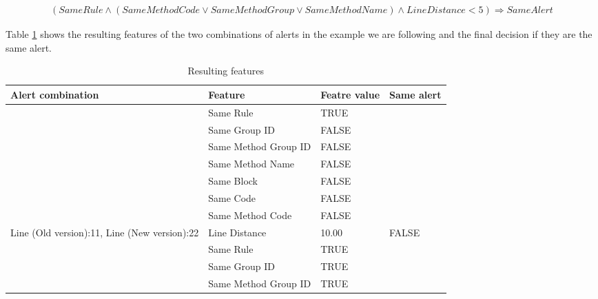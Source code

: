 \documentclass[
]{article}
\begin{document}
\scriptsize

\[
\begin{aligned}
(SameRule \land 
(SameMethodCode \lor SameMethodGroup \lor SameMethodName) \land 
LineDistance < 5) \Rightarrow SameAlert
\end{aligned}\]

\normalsize

Table \ref{table_features_with_decision} shows the resulting features of
the two combinations of alerts in the example we are following and the
final decision if they are the same alert.

\small

%
%

\begin{table}[H]

\caption{\label{tab:unnamed-chunk-14}Resulting features\label{table_features_with_decision} }
\centering
\begin{tabular}[t]{l|l|l|l}
\hline
Alert combination & Feature & Featre value & Same alert\\
\hline
\rowcolor{gray!6}  \rowcolor{gray!6}   & Same Rule & TRUE & \\

 & Same Group ID & FALSE & \\

\rowcolor{gray!6}   & Same Method Group ID & FALSE & \\

 & Same Method Name & FALSE & \\

\rowcolor{gray!6}   & Same Block & FALSE & \\

 & Same Code & FALSE & \\

\rowcolor{gray!6}   & Same Method Code & FALSE & \\

\multirow[t]{-8}{*}{\raggedright\arraybackslash Line (Old version):11, Line (New version):22} & Line Distance & 10.00 & \multirow[t]{-8}{*}{\raggedright\arraybackslash FALSE}\\
\cline{1-4}
 & Same Rule & TRUE & \\

 & Same Group ID & TRUE & \\

\rowcolor{gray!6}   & Same Method Group ID & TRUE & \\


\end{tabular}
\end{table}
\end{document}
